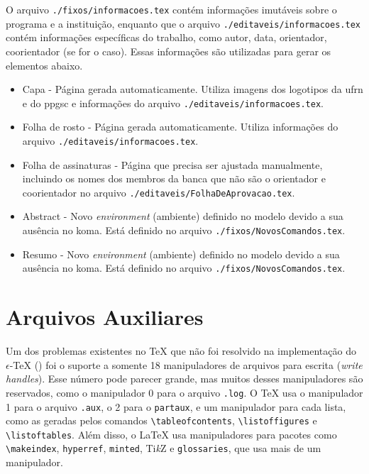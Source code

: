 O arquivo \texttt{./fixos/informacoes.tex} contém informações imutáveis sobre o programa e a instituição, enquanto que o arquivo  \texttt{./editaveis/informacoes.tex} contém informações específicas do trabalho, como autor, data, orientador, coorientador (se for o caso). Essas informações são utilizadas para gerar os elementos abaixo.

\begin{itemize}
	\item Capa - Página gerada automaticamente. Utiliza imagens dos logotipos da \gls{ufrn} e do \gls{ppgsc} e informações do arquivo \texttt{./editaveis/informacoes.tex}.
	\item Folha de rosto - Página gerada automaticamente. Utiliza  informações do arquivo \texttt{./editaveis/informacoes.tex}.
	\item Folha de assinaturas - Página que precisa ser ajustada manualmente, incluindo os nomes dos membros da banca que não são o orientador e coorientador no arquivo \texttt{./editaveis/FolhaDeAprovacao.tex}. 
	\item Abstract - Novo \textit{environment} (ambiente) definido no modelo devido a sua ausência no \gls{koma}. Está definido no arquivo \texttt{./fixos/NovosComandos.tex}.
	\item Resumo - Novo \textit{environment} (ambiente) definido no modelo devido a sua ausência no \gls{koma}. Está definido no arquivo \texttt{./fixos/NovosComandos.tex}.  
\end{itemize}

\section{Arquivos Auxiliares}

Um dos problemas existentes no \TeX{} que não foi resolvido na implementação do $\epsilon$-\TeX{} (\LaTeXe{}) foi o suporte a somente 18 manipuladores de arquivos para escrita (\textit{write handles}). Esse número pode parecer grande, mas muitos desses manipuladores são reservados, como o manipulador 0 para o arquivo \texttt{.log}. O \TeX{} usa o manipulador 1 para o arquivo \texttt{.aux}, o 2 para o \texttt{partaux}, e um manipulador para cada lista, como as geradas pelos comandos \texttt{\textbackslash{}tableofcontents},
\texttt{\textbackslash{}listoffigures} e \texttt{\textbackslash{}listoftables}. Além disso, o \LaTeX{} usa manipuladores para pacotes como \texttt{\textbackslash{}makeindex}, \texttt{hyperref}, \texttt{minted}, Ti\textit{k}Z e \texttt{glossaries}, que usa mais de um manipulador.

